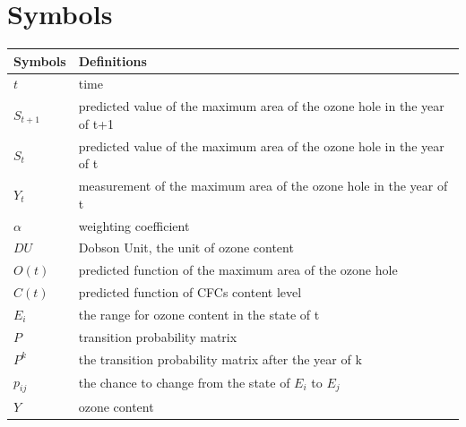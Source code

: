 \documentclass[12pt]{article}
\begin{document}
\section{Symbols}

\begin{tabular}{ll}
\hline
Symbols&Definitions\\
\hline
$t$& time\\
$S_{t+1}$& predicted value of the maximum area of the ozone hole in the year of t+1\\
$S_t$& predicted value of the maximum area of the ozone hole in the year of t\\
$Y_t$& measurement of the maximum area of the ozone hole in the year of t\\
$\alpha$& weighting coefficient\\
$DU$&Dobson Unit, the unit of ozone content\\
$O(t)$& predicted function of the maximum area of the ozone hole\\
$C(t)$& predicted function of CFCs content level\\
$E_i$& the range for ozone content in the state of t\\
$P$& transition probability matrix\\
$P^k$& the transition probability matrix after the year of k\\
$p_{ij}$& the chance to change from the state of $E_i$ to $E_j$\\
$Y$& ozone content\\
\hline
\end{tabular}


\newpage
\end{document}

